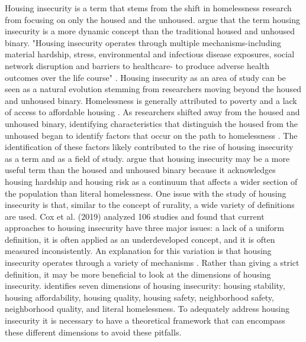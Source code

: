 Housing insecurity is a term that stems from the shift in homelessness research from focusing on only the housed and the unhoused. %
 \citep{deluca_housing_2022} argue that the term housing insecurity is a more dynamic concept than the traditional housed and unhoused binary. "Housing insecurity operates through multiple mechanisms-including material hardship, stress, environmental and infectious disease exposures, social network disruption and barriers to healthcare- to produce adverse health outcomes over the life course" \citep{leifheit_building_2022}. Housing insecurity as an area of study can be seen as a natural evolution stemming from researchers moving beyond the housed and unhoused binary. Homelessness is generally attributed to poverty and a lack of access to affordable housing \citep{noauthor_rural_2009}.  As researchers shifted away from the housed and unhoused binary, identifying characteristics that distinguish the housed from the unhoused began to identify factors that occur on the path to homelessness \citep{phelan_social_2010}.  The identification of these factors likely contributed to the rise of housing insecurity as a term and as a field of study.  \citet{deluca_housing_2022} argue that housing insecurity may be a more useful term than the housed and unhoused binary because it acknowledges housing hardship and housing risk as a continuum that affects a wider section of the population than literal homelessness.  One issue with the study of housing insecurity is that, similar to the concept of rurality, a wide variety of definitions are used. Cox et al. (2019) analyzed 106 studies and found that current approaches to housing insecurity have three major issues: a lack of a uniform definition, it is often applied as an underdeveloped concept, and it is often measured inconsistently. An explanation for this variation is that housing insecurity operates through a variety of mechanisms \citep{leifheit_building_2022}.  Rather than giving a strict definition, it may be more beneficial to look at the dimensions of housing insecurity. \citet{cox_road_2019} identifies seven dimensions of housing insecurity: housing stability, housing affordability, housing quality, housing safety, neighborhood safety, neighborhood quality, and literal homelessness. To adequately address housing insecurity it is necessary to have a theoretical framework that can encompass these different dimensions to avoid these pitfalls. 

